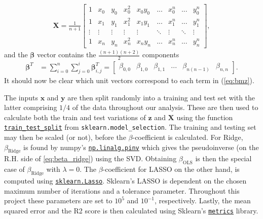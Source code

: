 \documentclass[%
reprint,
amsmath,amssymb,
aps,
pra,
]{revtex4-2}
\begin{document}
\begin{align}
	\bm X=\frac{1}{n+1}\begin{bmatrix}
		1 & x_0 & y_0 & x^2_0 & x_0y_0 & ... & x_0^n & ... & y_0^n\\
		1 & x_1 & y_1 & x_1^2 & x_1y_1 & ... & x_1^n & ... & y_1^n\\
		\vdots & \vdots & \vdots & \vdots & \vdots & \ddots & \vdots & \ddots & \vdots\\
		1 & x_n & y_n & x_n^2 & x_ny_n & ... & x_n^n & ... & y_n^n
	\end{bmatrix},
\end{align}
and the $\bm\beta$ vector contains the $\frac{(n+1)(n+2)}{2}$ components 
\begin{align*}
	\bm\beta^T&=\sum_{i=0}^n\sum_{j=0}^i\bm\beta_{i,j}^T=\begin{bmatrix}
		\beta_{0,0}&\beta_{1,0}&\beta_{1,1}&...&\beta_{n(n-1)}&\beta_{n,n}
	\end{bmatrix}.
\end{align*}
It should now be clear which unit vectors correspond to each term in (\ref{eq:bmz}).

The inputs $\bm x$ and $\bm y$ are then split randomly into a training and test set with the latter comprising \(1/4\) of the data throughout our analysis. These are then used to calculate both the train and test variations of $\bm z$ and $\bm X$ using the function \href{https://scikit-learn.org/stable/modules/generated/sklearn.model_selection.train_test_split.html}{\texttt{train\_test\_split}} from \texttt{sklearn.model\_selection}. The training and testing set may then be scaled (or not), before the \(\beta\)-coefficient is calculated. For Ridge, \(\beta_{\text{Ridge}}\) is found by numpy's \href{https://numpy.org/doc/2.0/reference/generated/numpy.linalg.pinv.html}{\texttt{np.linalg.pinv}} which gives the pseudoinverse (on the R.H. side of \eqref{eq:beta_ridge}) using the SVD. Obtaining \(\beta_{\text{OLS}}\) is then the special case of \(\beta_{\text{Ridge}}\) with \(\lambda=0\). The \(\beta\)-coefficient for LASSO on the other hand, is computed using \href{https://scikit-learn.org/stable/modules/generated/sklearn.linear_model.Lasso.html}{\texttt{sklearn.Lasso}}. 
Sklearn's LASSO is dependent on the chosen maximum number of iterations and a tolerance parameter. Throughout this project these parameters are set to \(10^5\) and \(10^{-1}\), respectively. Lastly, the mean squared error and the R2 score is then calculated using Sklearn's \href{https://scikit-learn.org/stable/modules/model_evaluation.html}{\texttt{metrics}} library.
\end{document}
